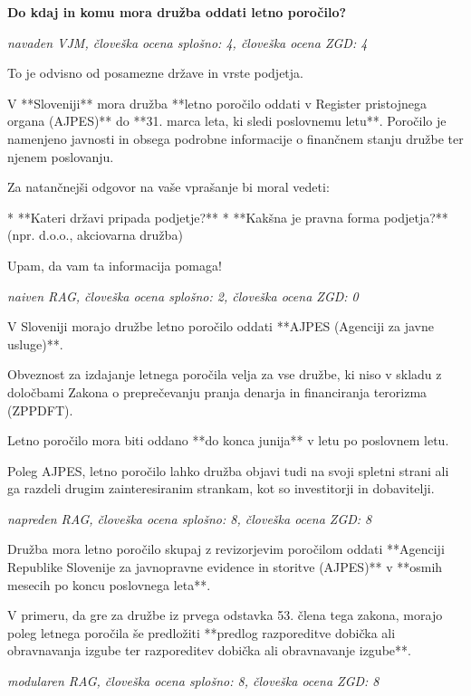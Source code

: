 \documentclass[a4paper,12pt,openright]{book}
\begin{document}
\textbf{Do kdaj in komu mora družba oddati letno poročilo?}

\textit{navaden VJM, človeška ocena splošno: 4, človeška ocena ZGD: 4}

To je odvisno od posamezne države in vrste podjetja.

V **Sloveniji** mora družba **letno poročilo oddati v Register pristojnega organa (AJPES)** do **31. marca leta, ki sledi poslovnemu letu**. Poročilo je namenjeno javnosti in obsega podrobne informacije o finančnem stanju družbe ter njenem poslovanju.

Za natančnejši odgovor na vaše vprašanje bi moral vedeti:

* **Kateri državi pripada podjetje?**
* **Kakšna je pravna forma podjetja?** (npr. d.o.o., akciovarna družba)



Upam, da vam ta informacija pomaga!

\vspace{0.5cm}
\textit{naiven RAG, človeška ocena splošno: 2, človeška ocena ZGD: 0}

V Sloveniji morajo družbe letno poročilo oddati **AJPES (Agenciji za javne usluge)**.

Obveznost za izdajanje letnega poročila velja za vse družbe, ki niso v skladu z določbami Zakona o preprečevanju pranja denarja in financiranja terorizma (ZPPDFT).

Letno poročilo mora biti oddano **do konca junija** v letu po poslovnem letu.

Poleg AJPES, letno poročilo lahko družba objavi tudi na svoji spletni strani ali ga razdeli drugim zainteresiranim strankam, kot so investitorji in dobavitelji.

\vspace{0.5cm}
\textit{napreden RAG, človeška ocena splošno: 8, človeška ocena ZGD: 8}

Družba mora letno poročilo skupaj z revizorjevim poročilom oddati **Agenciji Republike Slovenije za javnopravne evidence in storitve (AJPES)** v **osmih mesecih po koncu poslovnega leta**.


V primeru, da gre za družbe iz prvega odstavka 53. člena tega zakona, morajo poleg letnega poročila še predložiti **predlog razporeditve dobička ali obravnavanja izgube ter razporeditev dobička ali obravnavanje izgube**.

\vspace{0.5cm}
\textit{modularen RAG, človeška ocena splošno: 8, človeška ocena ZGD: 8}
\end{document}

